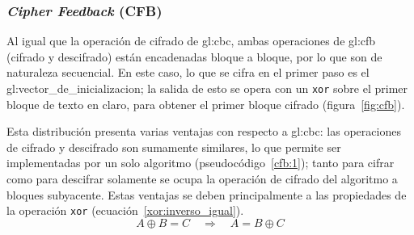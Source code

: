 %
%

\subsubsection{\textit{Cipher Feedback} (CFB)}

Al igual que la operación de cifrado de \gls{gl:cbc}, ambas operaciones
de \gls{gl:cfb} (cifrado y descifrado) están encadenadas bloque a bloque,
por lo que son de naturaleza secuencial. En este caso, lo que se cifra en el
primer paso es el \gls{gl:vector_de_inicializacion}; la salida de esto se opera
con un \verb|xor| sobre el primer bloque de texto en claro, para obtener el
primer bloque cifrado (figura~\ref{fig:cfb}).

Esta distribución presenta varias ventajas con respecto a \gls{gl:cbc}:
las operaciones de cifrado y descifrado son sumamente similares, lo que permite
ser implementadas por un solo algoritmo (pseudocódigo~\ref{cfb:1}); tanto para
cifrar como para descifrar solamente se ocupa la operación de cifrado del
algoritmo a bloques subyacente. Estas ventajas se deben principalmente a las
propiedades de la operación \verb|xor| (ecuación~\ref{xor:inverso_igual}).
\begin{equation}
  \label{xor:inverso_igual}
  A \oplus B = C \quad \Rightarrow \quad A = B \oplus C
\end{equation}

